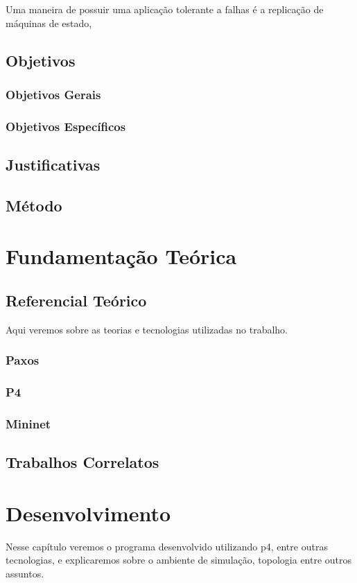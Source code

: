 \documentclass[12pt,
openright, 
oneside,
a4paper,
brazil]{facom-ufu-abntex2}
\begin{document}
Uma maneira de possuir uma aplicação tolerante a falhas é a replicação de máquinas
de estado, 

\section{Objetivos}
\subsection{Objetivos Gerais}
\subsection{Objetivos Específicos}

\section{Justificativas}
\section{Método}

\chapter{Fundamentação Teórica}
\section{Referencial Teórico}
Aqui veremos sobre as teorias e tecnologias utilizadas no trabalho.
\subsection{Paxos}
\subsection{P4}
\subsection{Mininet}


\section{Trabalhos Correlatos}


\chapter{Desenvolvimento}
Nesse capítulo veremos o programa desenvolvido utilizando p4, entre outras tecnologias, e explicaremos sobre o ambiente de simulação, topologia entre outros assuntos.
 
\end{document}

